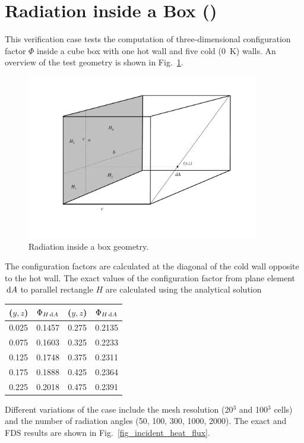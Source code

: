 \documentclass[11pt]{book}
\begin{document}
\section{Radiation inside a Box (\texorpdfstring{}{radiation\_box}) }
\label{radiation_in_a_box}
\label{radiation_box}

This verification case tests the computation of three-dimensional configuration factor $\Phi$ inside a cube box with one hot wall and five cold (0~K) walls. An overview of the test geometry is shown in Fig.~\ref{fig_box_radiation}.
\begin{figure}[ht]
\centering
\includegraphics[width=4.0in]{FIGURES/box}
\caption{\label{fig_box_radiation} Radiation inside a box geometry.}
\end{figure}
The configuration factors are calculated at the diagonal of the cold wall opposite to the hot wall. The exact values of the configuration factor from plane element $\,\mathrm{d} A$ to parallel rectangle $H$ are calculated using the analytical solution~\cite{Siegel:1}
\begin{center}
\begin{tabular}{|c|c|c|c|}
\hline ($y,z$) & $\Phi_{H \,\mathrm{d} A}$ & ($y,z$) & $\Phi_{H \,\mathrm{d} A}$ \\ \hline \hline
0.025   &0.1457 & 0.275 &0.2135 \\
0.075   &0.1603 & 0.325 &0.2233 \\
0.125   &0.1748 & 0.375 &0.2311 \\
0.175   &0.1888 & 0.425 &0.2364 \\
0.225   &0.2018 & 0.475 &0.2391 \\ \hline
\end{tabular}
\end{center}
Different variations of the case include the mesh resolution (20$^3$ and 100$^3$ cells) and the number of radiation angles (50, 100, 300, 1000, 2000). The exact and FDS results are shown in Fig.~\ref{fig_incident_heat_flux}.
\end{document}
